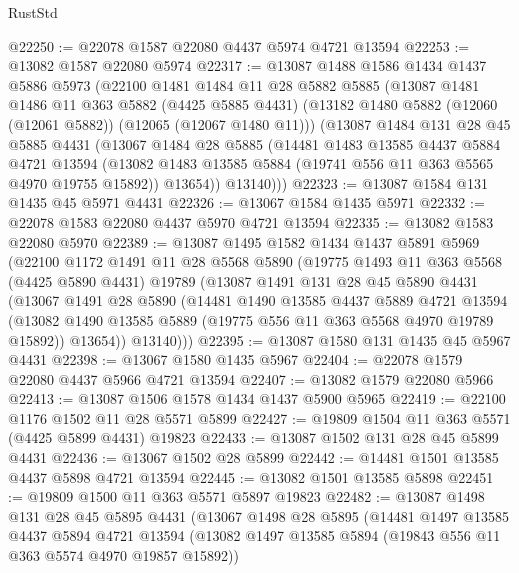 \begin{lexlean}{RustStd}
\begin{coremodule}
@22250 := @22078 @1587 @22080 @4437 @5974 @4721 @13594
@22253 := @13082 @1587 @22080 @5974
@22317 := @13087
    @1488
    @1586
    @1434
    @1437
    @5886
    @5973
    (@22100
      @1481
      @1484
      @11
      @28
      @5882
      @5885
      (@13087
        @1481
        @1486
        @11
        @363
        @5882
        (@4425 @5885 @4431)
        (@13182 @1480 @5882 (@12060 (@12061 @5882)) (@12065 (@12067 @1480 @11)))
        (@13087
          @1484
          @131
          @28
          @45
          @5885
          @4431
          (@13067
            @1484
            @28
            @5885
            (@14481
              @1483
              @13585
              @4437
              @5884
              @4721
              @13594
              (@13082 @1483 @13585 @5884 (@19741 @556 @11 @363 @5565 @4970 @19755 @15892))
              @13654))
          @13140)))
@22323 := @13087 @1584 @131 @1435 @45 @5971 @4431
@22326 := @13067 @1584 @1435 @5971
@22332 := @22078 @1583 @22080 @4437 @5970 @4721 @13594
@22335 := @13082 @1583 @22080 @5970
@22389 := @13087
    @1495
    @1582
    @1434
    @1437
    @5891
    @5969
    (@22100
      @1172
      @1491
      @11
      @28
      @5568
      @5890
      (@19775
        @1493
        @11
        @363
        @5568
        (@4425 @5890 @4431)
        @19789
        (@13087
          @1491
          @131
          @28
          @45
          @5890
          @4431
          (@13067
            @1491
            @28
            @5890
            (@14481
              @1490
              @13585
              @4437
              @5889
              @4721
              @13594
              (@13082 @1490 @13585 @5889 (@19775 @556 @11 @363 @5568 @4970 @19789 @15892))
              @13654))
          @13140)))
@22395 := @13087 @1580 @131 @1435 @45 @5967 @4431
@22398 := @13067 @1580 @1435 @5967
@22404 := @22078 @1579 @22080 @4437 @5966 @4721 @13594
@22407 := @13082 @1579 @22080 @5966
@22413 := @13087 @1506 @1578 @1434 @1437 @5900 @5965
@22419 := @22100 @1176 @1502 @11 @28 @5571 @5899
@22427 := @19809 @1504 @11 @363 @5571 (@4425 @5899 @4431) @19823
@22433 := @13087 @1502 @131 @28 @45 @5899 @4431
@22436 := @13067 @1502 @28 @5899
@22442 := @14481 @1501 @13585 @4437 @5898 @4721 @13594
@22445 := @13082 @1501 @13585 @5898
@22451 := @19809 @1500 @11 @363 @5571 @5897 @19823
@22482 := @13087
    @1498
    @131
    @28
    @45
    @5895
    @4431
    (@13067
      @1498
      @28
      @5895
      (@14481
        @1497
        @13585
        @4437
        @5894
        @4721
        @13594
        (@13082 @1497 @13585 @5894 (@19843 @556 @11 @363 @5574 @4970 @19857 @15892))

\end{coremodule}
\end{lexlean}
